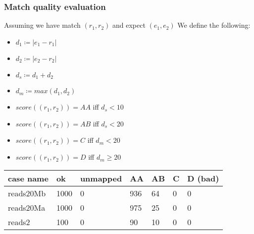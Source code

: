 \begin{frame}
  \frametitle{Match quality evaluation}

  Assuming we have match $(r_1, r_2)$ and expect $(e_1, e_2)$
  We define the following:

  \begin{itemize}
    \item $d_1 \coloneqq |e_1 - r_1|$
    \item $d_2 \coloneqq |e_2 - r_2|$
    \item $d_s \coloneqq d_1 + d_2$
    \item $d_m \coloneqq max(d_1, d_2)$
  \end{itemize}

  \begin{itemize}
    \item $score((r_1, r_2)) = AA$ iff $d_s < 10$
    \item $score((r_1, r_2)) = AB$ iff $d_s < 20$
    \item $score((r_1, r_2)) = C$ iff $d_m < 20$
    \item $score((r_1, r_2)) = D$ iff $d_m \geq 20$
  \end{itemize}

  
  \begin{table}[]
    \begin{tabular}{|l|l|l|l|l|l|l|}
    \hline
    case name                        & ok                          & unmapped                 & AA                         & AB                        & C                        & D (bad)                  \\ \hline
    \rowcolor[HTML]{333333} 
    {\color[HTML]{FFFFFF} reads20Mb} & {\color[HTML]{FFFFFF} 1000} & {\color[HTML]{FFFFFF} 0} & {\color[HTML]{FFFFFF} 936} & {\color[HTML]{FFFFFF} 64} & {\color[HTML]{FFFFFF} 0} & {\color[HTML]{FFFFFF} 0} \\ \hline
    \rowcolor[HTML]{FFFFFF} 
    {\color[HTML]{333333} reads20Ma} & {\color[HTML]{333333} 1000} & {\color[HTML]{333333} 0} & {\color[HTML]{333333} 975} & {\color[HTML]{333333} 25} & {\color[HTML]{333333} 0} & {\color[HTML]{333333} 0} \\ \hline
    \rowcolor[HTML]{333333} 
    {\color[HTML]{DAE8FC} reads2}    & {\color[HTML]{DAE8FC} 100}  & {\color[HTML]{DAE8FC} 0} & {\color[HTML]{DAE8FC} 90}  & {\color[HTML]{DAE8FC} 10} & {\color[HTML]{DAE8FC} 0} & {\color[HTML]{DAE8FC} 0} \\ \hline
    \end{tabular}
  
  \end{table}

\end{frame}


